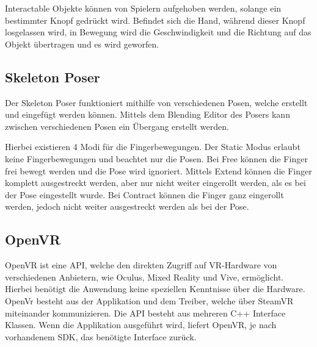Interactable Objekte können von Spielern aufgehoben werden, solange ein bestimmter Knopf gedrückt wird.
Befindet sich die Hand, während dieser Knopf losgelassen wird, in Bewegung wird die Geschwindigkeit und die Richtung auf das Objekt übertragen und es wird geworfen.
~\cite{SteamVR_Interaction_System_2022}

\subsection{Skeleton Poser}\label{subsec:skeleton-poser}
Der Skeleton Poser funktioniert mithilfe von verschiedenen Posen, welche erstellt und eingefügt werden können.
Mittels dem Blending Editor des Posers kann zwischen verschiedenen Posen ein Übergang erstellt werden.

Hierbei existieren 4 Modi für die Fingerbewegungen.
Der Static Modus erlaubt keine Fingerbewegungen und beachtet nur die Posen.
Bei Free können die Finger frei bewegt werden und die Pose wird ignoriert.
Mittels Extend können die Finger komplett ausgestreckt werden, aber nur nicht weiter eingerollt werden, als es bei der Pose eingestellt wurde.
Bei Contract können die Finger ganz eingerollt werden, jedoch nicht weiter ausgestreckt werden als bei der Pose.
~\cite{SteamVR_Skeleton_Poser_2022}

\subsection{OpenVR}\label{subsec:openvr}
OpenVR ist eine API, welche den direkten Zugriff auf VR-Hardware von verschiedenen Anbietern, wie Oculus, Mixed Reality und Vive, ermöglicht.
Hierbei benötigt die Anwendung keine speziellen Kenntnisse über die Hardware.
OpenVr besteht aus der Applikation und dem Treiber, welche über SteamVR miteinander kommunizieren.
Die API besteht aus mehreren C++ Interface Klassen.
Wenn die Applikation ausgeführt wird, liefert OpenVR, je nach vorhandenem SDK, das benötigte Interface zurück.
~\cite{OpenVR_Github_Documentation_2020}

